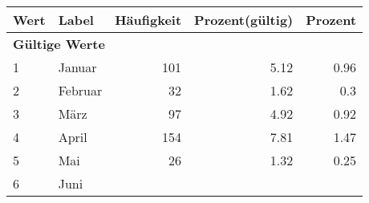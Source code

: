      \begin{longtable}{lXrrr}
     \toprule
     \textbf{Wert} & \textbf{Label} & \textbf{Häufigkeit} & \textbf{Prozent(gültig)} & \textbf{Prozent} \\
     \endhead
     \midrule
     \multicolumn{5}{l}{\textbf{Gültige Werte}}\\

     1 &
     \multicolumn{1}{X}{ Januar   } &


       \num{101} &
       \num[round-mode=places,round-precision=2]{5,12} &
         \num[round-mode=places,round-precision=2]{0,96} \\

     2 &
     \multicolumn{1}{X}{ Februar   } &


       \num{32} &
       \num[round-mode=places,round-precision=2]{1,62} &
         \num[round-mode=places,round-precision=2]{0,3} \\

     3 &
     \multicolumn{1}{X}{ März   } &


       \num{97} &
       \num[round-mode=places,round-precision=2]{4,92} &
         \num[round-mode=places,round-precision=2]{0,92} \\

     4 &
     \multicolumn{1}{X}{ April   } &


       \num{154} &
       \num[round-mode=places,round-precision=2]{7,81} &
         \num[round-mode=places,round-precision=2]{1,47} \\

     5 &
     \multicolumn{1}{X}{ Mai   } &


       \num{26} &
       \num[round-mode=places,round-precision=2]{1,32} &
         \num[round-mode=places,round-precision=2]{0,25} \\

     6 &
     \multicolumn{1}{X}{ Juni   } &



\end{longtable}
